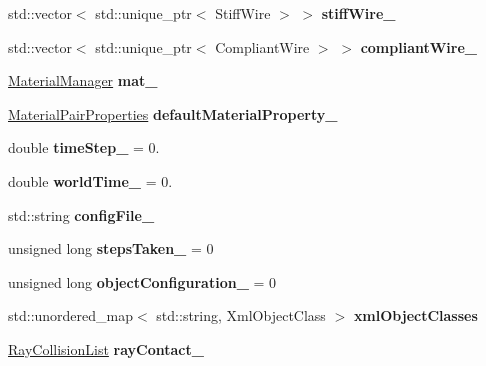 \begin{DoxyCompactItemize}
std\+::vector$<$ std\+::unique\+\_\+ptr$<$ Stiff\+Wire $>$ $>$ {\bfseries stiff\+Wire\+\_\+}
\item 
\mbox{\label{classraisim_1_1World_a7995c51d527af7c1d96b79426628c672}} 
std\+::vector$<$ std\+::unique\+\_\+ptr$<$ Compliant\+Wire $>$ $>$ {\bfseries compliant\+Wire\+\_\+}
\item 
\mbox{\label{classraisim_1_1World_a54fb6c3dc9c64afb29c58ba59299ddd6}} 
\hyperlink{classraisim_1_1MaterialManager}{Material\+Manager} {\bfseries mat\+\_\+}
\item 
\mbox{\label{classraisim_1_1World_adf42a6e32cff6cb9202474b68d28369c}} 
\hyperlink{structraisim_1_1MaterialPairProperties}{Material\+Pair\+Properties} {\bfseries default\+Material\+Property\+\_\+}
\item 
\mbox{\label{classraisim_1_1World_ab94955ee9501ce165202b81fbdd7563b}} 
double {\bfseries time\+Step\+\_\+} = 0.
\item 
\mbox{\label{classraisim_1_1World_a83a92a87cca546853b25b3dae26fd7d3}} 
double {\bfseries world\+Time\+\_\+} = 0.
\item 
\mbox{\label{classraisim_1_1World_a3e1319a1aa52a8e0775186f3f5e7857b}} 
std\+::string {\bfseries config\+File\+\_\+}
\item 
\mbox{\label{classraisim_1_1World_a1d70df6f6b1398076c6ed819b05d5fe1}} 
unsigned long {\bfseries steps\+Taken\+\_\+} = 0
\item 
\mbox{\label{classraisim_1_1World_a127cdf4ca2e06a54c53085212a779e3c}} 
unsigned long {\bfseries object\+Configuration\+\_\+} = 0
\item 
\mbox{\label{classraisim_1_1World_a20b9dd369e7b64fba158a75286998729}} 
std\+::unordered\+\_\+map$<$ std\+::string, Xml\+Object\+Class $>$ {\bfseries xml\+Object\+Classes}
\item 
\mbox{\label{classraisim_1_1World_a27761dec7b706638dbf29b35e203978b}} 
\hyperlink{classraisim_1_1RayCollisionList}{Ray\+Collision\+List} {\bfseries ray\+Contact\+\_\+}
\end{DoxyCompactItemize}


